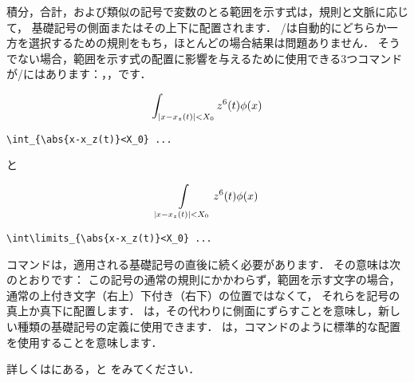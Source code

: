 積分，合計，および類似の記号で変数のとる範囲を示す式は，規則と文脈に応じて，
基礎記号の側面またはその上下に配置されます．
\lat/は自動的にどちらか一方を選択するための規則をもち，ほとんどの場合結果は問題ありません．
そうでない場合，範囲を示す式の配置に影響を与えるために使用できる3つコマンドが\lat/にはあります：，，です．
\begin{center}
\begin{minipage}{.4\columnwidth}
\[\int_{\lvert x-x_z(t)\rvert<X_0} z^6(t)\phi(x)\]
\begin{verbatim}
\int_{\abs{x-x_z(t)}<X_0} ...
\end{verbatim}
\end{minipage}\quad
と\quad
\begin{minipage}{.5\columnwidth}
\[\int\limits_{\lvert x-x_z(t)\rvert<X_0} z^6(t)\phi(x)\]
\begin{verbatim}
\int\limits_{\abs{x-x_z(t)}<X_0} ...
\end{verbatim}
\end{minipage}
\end{center}
コマンドは，適用される基礎記号の直後に続く必要があります．
その意味は次のとおりです：
この記号の通常の規則にかかわらず，範囲を示す文字の場合，
通常の上付き文字（右上）下付き（右下）の位置ではなくて，
それらを記号の真上か真下に配置します．
は，その代わりに側面にずらすことを意味し，新しい種類の基礎記号の定義に使用できます．
は，コマンドのように標準的な配置を使用することを意味します．

詳しくは\cite{amsldoc}にある，と
をみてください．

